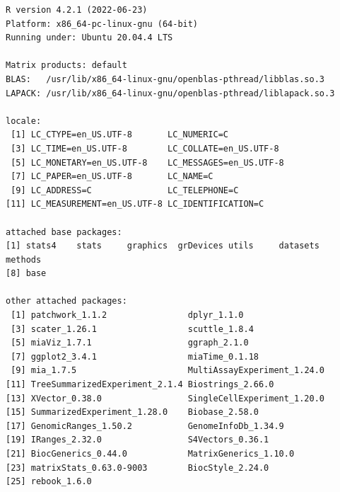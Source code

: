 \documentclass[
]{book}
\begin{document}
\begin{verbatim}
R version 4.2.1 (2022-06-23)
Platform: x86_64-pc-linux-gnu (64-bit)
Running under: Ubuntu 20.04.4 LTS

Matrix products: default
BLAS:   /usr/lib/x86_64-linux-gnu/openblas-pthread/libblas.so.3
LAPACK: /usr/lib/x86_64-linux-gnu/openblas-pthread/liblapack.so.3

locale:
 [1] LC_CTYPE=en_US.UTF-8       LC_NUMERIC=C              
 [3] LC_TIME=en_US.UTF-8        LC_COLLATE=en_US.UTF-8    
 [5] LC_MONETARY=en_US.UTF-8    LC_MESSAGES=en_US.UTF-8   
 [7] LC_PAPER=en_US.UTF-8       LC_NAME=C                 
 [9] LC_ADDRESS=C               LC_TELEPHONE=C            
[11] LC_MEASUREMENT=en_US.UTF-8 LC_IDENTIFICATION=C       

attached base packages:
[1] stats4    stats     graphics  grDevices utils     datasets  methods  
[8] base     

other attached packages:
 [1] patchwork_1.1.2                dplyr_1.1.0                   
 [3] scater_1.26.1                  scuttle_1.8.4                 
 [5] miaViz_1.7.1                   ggraph_2.1.0                  
 [7] ggplot2_3.4.1                  miaTime_0.1.18                
 [9] mia_1.7.5                      MultiAssayExperiment_1.24.0   
[11] TreeSummarizedExperiment_2.1.4 Biostrings_2.66.0             
[13] XVector_0.38.0                 SingleCellExperiment_1.20.0   
[15] SummarizedExperiment_1.28.0    Biobase_2.58.0                
[17] GenomicRanges_1.50.2           GenomeInfoDb_1.34.9           
[19] IRanges_2.32.0                 S4Vectors_0.36.1              
[21] BiocGenerics_0.44.0            MatrixGenerics_1.10.0         
[23] matrixStats_0.63.0-9003        BiocStyle_2.24.0              
[25] rebook_1.6.0                  


\end{verbatim}
\end{document}

